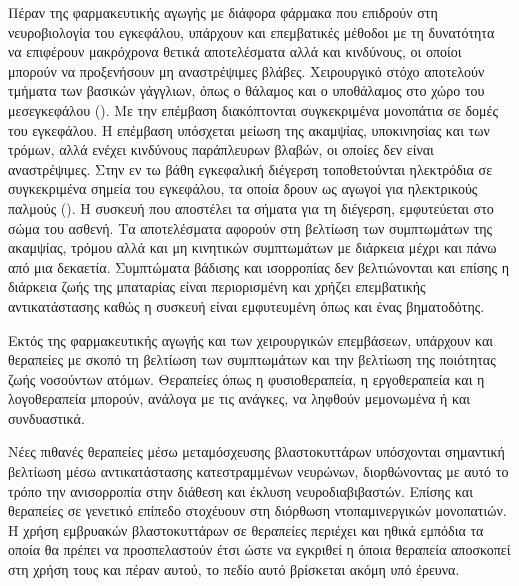 \documentclass[12pt]{report}
\begin{document}
        \par
        Πέραν της φαρμακευτικής αγωγής με διάφορα φάρμακα που επιδρούν στη νευροβιολογία του εγκεφάλου, υπάρχουν και επεμβατικές μέθοδοι με τη δυνατότητα να επιφέρουν μακρόχρονα θετικά αποτελέσματα αλλά και κινδύνους, οι οποίοι μπορούν να προξενήσουν μη αναστρέψιμες βλάβες. Χειρουργικό στόχο αποτελούν τμήματα των βασικών γάγγλιων, όπως ο θάλαμος και ο υποθάλαμος στο χώρο του μεσεγκεφάλου (\emph{\cite{Starr1998AblativeDisease}}). Με την επέμβαση διακόπτονται συγκεκριμένα μονοπάτια σε δομές του εγκεφάλου. Η επέμβαση υπόσχεται μείωση της ακαμψίας, υποκινησίας και των τρόμων, αλλά ενέχει κινδύνους παράπλευρων βλαβών, οι οποίες δεν είναι αναστρέψιμες. Στην εν τω βάθη εγκεφαλική διέγερση τοποθετούνται ηλεκτρόδια σε συγκεκριμένα σημεία του εγκεφάλου, τα οποία δρουν ως αγωγοί για ηλεκτρικούς παλμούς (\emph{\cite{Fariba2023DeepStimulation}}). Η συσκευή που αποστέλει τα σήματα για τη διέγερση, εμφυτεύεται στο σώμα του ασθενή. Τα αποτελέσματα αφορούν στη βελτίωση των συμπτωμάτων της ακαμψίας, τρόμου αλλά και μη κινητικών συμπτωμάτων με διάρκεια μέχρι και πάνω από μια δεκαετία. Συμπτώματα βάδισης και ισορροπίας δεν βελτιώνονται και επίσης η διάρκεια ζωής της μπαταρίας είναι περιορισμένη και χρήζει επεμβατικής αντικατάστασης καθώς η συσκευή είναι εμφυτευμένη όπως και ένας βηματοδότης.
        \par
        Εκτός της φαρμακευτικής αγωγής και των χειρουργικών επεμβάσεων, υπάρχουν και θεραπείες με σκοπό τη βελτίωση των συμπτωμάτων και την βελτίωση της ποιότητας ζωής νοσούντων ατόμων. Θεραπείες όπως η φυσιοθεραπεία, η εργοθεραπεία και η λογοθεραπεία μπορούν, ανάλογα με τις ανάγκες, να ληφθούν μεμονωμένα ή και συνδυαστικά.
        \par
        Νέες πιθανές θεραπείες μέσω μεταμόσχευσης βλαστοκυττάρων υπόσχονται σημαντική βελτίωση μέσω αντικατάστασης κατεστραμμένων νευρώνων, διορθώνοντας με αυτό το τρόπο την ανισορροπία στην διάθεση και έκλυση νευροδιαβιβαστών. Επίσης και θεραπείες σε γενετικό επίπεδο στοχέυουν στη διόρθωση ντοπαμινεργικών μονοπατιών. Η χρήση εμβρυακών βλαστοκυττάρων σε θεραπείες περιέχει και ηθικά εμπόδια τα οποία θα πρέπει να προσπελαστούν έτσι ώστε να εγκριθεί η όποια θεραπεία αποσκοπεί στη χρήση τους και πέραν αυτού, το πεδίο αυτό βρίσκεται ακόμη υπό έρευνα.
        
\end{document}
